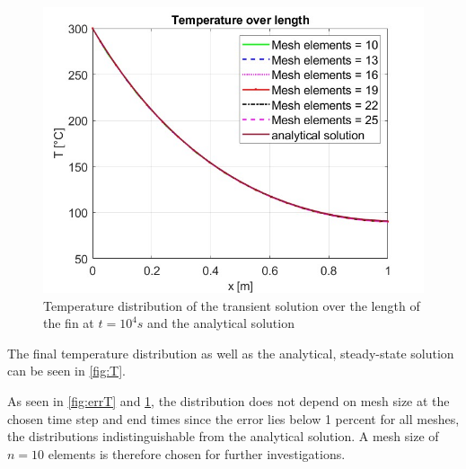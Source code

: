\begin{figure}[H]
    \centering
    \includegraphics[width=.75\textwidth]{figures/TsmalldtBigt.jpg}
    \caption{Temperature distribution of the transient solution over the length of the fin at $t = 10^4 s$ and the analytical solution}
    \label{fig:T}
\end{figure}

The final temperature distribution as well as the analytical, steady-state solution can be seen in \autoref{fig:T}.

As seen in \autoref{fig:errT} and \ref{fig:T}, the distribution does not depend on mesh size at the chosen time step and end times since the error lies below 1 percent for all meshes, the distributions indistinguishable from the analytical solution. A mesh size of $n = 10$ elements is therefore chosen for further investigations.









